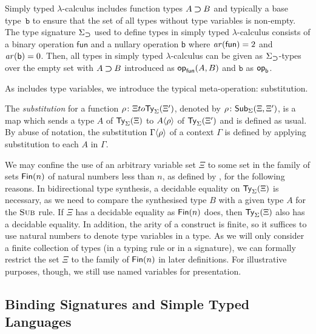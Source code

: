 \begin{example} \label{ex:type-signature-for-function-type}
  Simply typed $\lambda$-calculus includes function types $A \mathbin{\bm{\supset}} B$ and typically a base type~$\mathtt{b}$ to ensure that the set of all types without type variables is non-empty.
  The type signature $\Sigma_{\mathbin{\bm{\supset}}}$ used to define types in simply typed $\lambda$-calculus consists of a binary operation $\mathsf{fun}$ and a nullary operation $\mathsf{b}$ where $\mathit{ar}(\mathsf{fun}) = 2$ and $\mathit{ar}(\mathsf{b}) = 0$.
  Then, all types in simply typed $\lambda$-calculus can be given as $\Sigma_{\mathbin{\bm{\supset}}}$-types over the empty set with $A \mathbin{\bm{\supset}} B$ introduced as $\mathsf{op}_{\mathsf{fun}}(A, B)$ and $\mathtt{b}$ as $\mathsf{op}_{\mathsf{b}}$. 
\end{example}

As  includes type variables, we introduce the typical meta-operation: substitution.
\begin{definition}
  The \emph{substitution} for a function $\rho\colon \Xi to \mathsf{Ty}_{\Sigma}(\Xi')$, denoted by $\rho\colon \mathsf{Sub}_{\Sigma}(\Xi,\Xi')$, is a map which sends a type $A$ of $\mathsf{Ty}_{\Sigma}(\Xi)$ to ${A}\!\left<{\rho}\right>$ of $\mathsf{Ty}_{\Sigma}(\Xi')$ and is defined as usual.
  By abuse of notation, the substitution ${\Gamma}\!\left<{\rho}\right>$ of a context $\Gamma$ is defined by applying substitution to each $A$ in $\Gamma$.
\end{definition}

We may confine the use of an arbitrary variable set $\Xi$ to some set in the family of sets $\mathsf{Fin}(n)$ of natural numbers less than $n$, as defined by \citet{Dybjer1994}, for the following reasons.
In bidirectional type synthesis, a decidable equality on $\mathsf{Ty}_{\Sigma}(\Xi)$ is necessary, as we need to compare the synthesised type $B$ with a given type $A$ for the $\textnormal{\textsc{Sub}}$ rule.
If $\Xi$ has a decidable equality as $\mathsf{Fin}(n)$ does, then $\mathsf{Ty}_{\Sigma}(\Xi)$ also has a decidable equality.
In addition, the arity of a construct is finite, so it suffices to use natural numbers to denote type variables in a type.
As we will only consider a finite collection of types (in a typing rule or in a signature), we can formally restrict the set $\Xi$ to the family of $\mathsf{Fin}(n)$ in later definitions.
For illustrative purposes, though, we still use named variables for presentation.
\subsection{Binding Signatures and Simple Typed Languages} \label{subsec:binding-sig}

